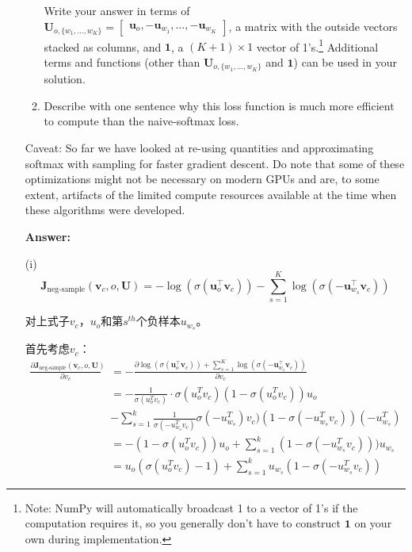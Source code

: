 \documentclass{article}
\newenvironment{answer}{
    {\bf Answer:} \sf \begingroup\color{red}
}{\endgroup}%
\begin{document}
\begin{enumerate}[label=(\alph*)]
\begin{enumerate}[label=(\roman*)]
Write your answer in terms of \\ $\bm{U}_{o, \{w_1, \dots, w_K\}} = \begin{bmatrix} \bm{u}_o, -\bm{u}_{w_1}, \dots, -\bm{u}_{w_K} \end{bmatrix}$, a matrix with the outside vectors stacked as columns, and $\bm{1}$, a $(K + 1) \times 1$ vector of 1's.\footnote{Note: NumPy will automatically broadcast 1 to a vector of 1's if the computation requires it, so you generally don't have to construct $\bm{1}$ on your own during implementation.}
Additional terms and functions (other than $\bm{U}_{o, \{w_1, \dots, w_K\}}$ and $\bm{1}$) can be used in your solution.
\item Describe with one sentence why this loss function is much more efficient to compute than the naive-softmax loss.
\end{enumerate}

Caveat: So far we have looked at re-using quantities and approximating softmax with sampling for faster gradient descent. Do note that some of these optimizations might not be necessary on modern GPUs and are, to some extent, artifacts of the limited compute resources available at the time when these algorithms were developed.

\begin{shaded}
\begin{answer}
(i)
\begin{equation}
\bm J_{\text{neg-sample}}(\bm v_c, o, \bm U) = -\log(\sigma(\bm u_o^\top \bm v_c)) - \sum_{s=1}^K \log(\sigma(-\bm u_{w_s}^\top \bm v_c))
\end{equation}

对上式子$v_c$，$u_o$和第$s^{th}$个负样本$u_{w_s}$。

首先考虑$v_c$：
\begin{equation}
	\begin{array}{cl}
 \frac{\partial \bm J_{\text{neg-sample}}(\bm v_c, o, \bm U)}{\partial  v_c} &= -\frac{\partial \log(\sigma(\bm u_o^\top \bm v_c)) +\sum_{s=1}^K \log(\sigma(-\bm u_{w_s}^\top \bm v_c)) }{\partial v_c}\\
&= -\frac{1}{\sigma(u_o^T v_c)} \cdot \sigma(u_o^T v_c) (1- \sigma(u_o^T v_c) ) u_o \\
& - \sum_{s=1}^k \frac{1}{\sigma(-u_{w_s}^T v_c)}\sigma(-u_{w_s}^T)v_c) (1-\sigma(-u_{w_s}^T v_c)) (-u_{w_s}^T)	\\
&= - (1-\sigma(u_o^T v_c))u_o +\sum_{s=1}^k(1-\sigma(-u_{w_s}^T v_c))) u_{w_s}\\
&= u_o (\sigma(u_o^T v_c)-1) + \sum_{s=1}^k u_{w_s} (1- \sigma(-u_{w_s}^T v_c))
\end{array}
\end{equation}



\end{answer}
\end{shaded}
\end{enumerate}
\end{document}
